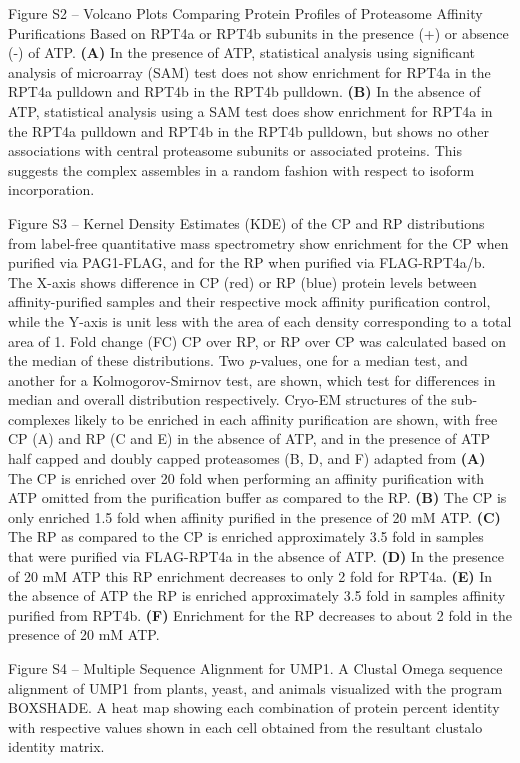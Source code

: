 Figure S2 – Volcano Plots Comparing Protein Profiles of Proteasome Affinity Purifications Based on RPT4a or RPT4b subunits in the presence (+) or absence (-) of ATP. \textbf{(A)} In the presence of ATP, statistical analysis using significant analysis of microarray (SAM) test does not show enrichment for RPT4a in the RPT4a pulldown and RPT4b in the RPT4b pulldown. \textbf{(B)} In the absence of ATP, statistical analysis using a SAM test does show enrichment for RPT4a in the RPT4a pulldown and RPT4b in the RPT4b pulldown, but shows no other associations with central proteasome subunits or associated proteins. This suggests the complex assembles in a random fashion with respect to isoform incorporation.

Figure S3 – Kernel Density Estimates (KDE) of the CP and RP distributions from label-free quantitative mass spectrometry show enrichment for the CP when purified via PAG1-FLAG, and for the RP when purified via FLAG-RPT4a/b. The X-axis shows difference in CP (red) or RP (blue) protein levels between affinity-purified samples and their respective mock affinity purification control, while the Y-axis is unit less with the area of each density corresponding to a total area of 1. Fold change (FC) CP over RP, or RP over CP was calculated based on the median of these distributions. Two \textit{p}-values, one for a median test, and another for a Kolmogorov-Smirnov test, are shown, which test for differences in median and overall distribution respectively. Cryo-EM structures of the sub-complexes likely to be enriched in each affinity purification are shown, with free CP (A) and RP (C and E) in the absence of ATP, and in the presence of ATP half capped and doubly capped proteasomes (B, D, and F) adapted from \citep{beck12} \textbf{(A)} The CP is enriched over 20 fold when performing an affinity purification with ATP omitted from the purification buffer as compared to the RP. \textbf{(B)} The CP is only enriched 1.5 fold when affinity purified in the presence of 20 mM ATP. \textbf{(C)} The RP as compared to the CP is enriched approximately 3.5 fold in samples that were purified via FLAG-RPT4a in the absence of ATP. \textbf{(D)} In the presence of 20 mM ATP this RP enrichment decreases to only 2 fold for RPT4a. \textbf{(E)} In the absence of ATP the RP is enriched approximately 3.5 fold in samples affinity purified from RPT4b. \textbf{(F)} Enrichment for the RP decreases to about 2 fold in the presence of 20 mM ATP.


Figure S4 – Multiple Sequence Alignment for UMP1. A Clustal Omega \citep{sievers14} sequence alignment of UMP1 from plants, yeast, and animals visualized with the program BOXSHADE. A heat map showing each combination of protein percent identity with respective values shown in each cell obtained from the resultant clustalo identity matrix. 

